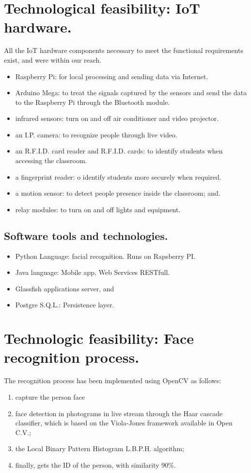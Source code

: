 \documentclass[]{scrartcl}
\begin{document}
\section*{Technological feasibility: IoT hardware.}
	All the IoT hardware components necessary to meet the functional requirements exist, and were within our reach.\\
	\begin{itemize}
		\item Raspberry Pi: for local processing and sending data via Internet.
		\item Arduino Mega: to treat the signals captured by the sensors and send the data to the Raspberry Pi through the Bluetooth module.
		\item infrared sensors: turn on and off air conditioner and video projector.
		\item an I.P. camera: to recognize people through live video.
		\item an R.F.I.D. card reader and R.F.I.D. cards: to identify students when accessing the classroom.
		\item a fingerprint reader: o identify students more securely when required.
		\item a motion sensor: to detect people presence inside the classroom; and.
		\item relay modules: to turn on and off lights and equipment.
	\end{itemize}
	
	\subsection*{Software tools and technologies.}
	\begin{itemize}
		\item Python Language: facial recognition. Runs on Rapsberry PI.
		\item Java language: Mobile app, Web Services RESTfull.
		\item Glassfish applications server, and
		\item Postgre S.Q.L.: Persistence layer.
	\end{itemize}
	
\section*{Technologic feasibility: Face recognition process.}
	The recognition process has been implemented using OpenCV as follows:
	\begin{enumerate}
		\item capture the person face
		\item face detection in photograms in live stream through the Haar cascade classifier, which is based on the Viola-Jones framework available in Open C.V.;
		\item the Local Binary Pattern Histogram L.B.P.H. algorithm;
		\item finally, gets the ID of the person, with similarity 90\%.
	\end{enumerate}
\end{document}
